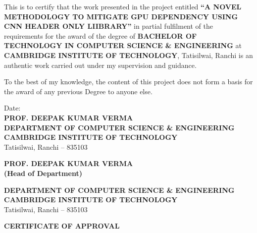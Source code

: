 \documentclass[12pt,oneside,a4paper]{report}
\newcommand{\prelimheading}[1]{%
  \begin{center}
    {\Large\bfseries\color{mnPrimary} #1}
  \end{center}
  \vspace{1cm}%
}
\begin{document}
This is to certify that the work presented in the project entitled \textbf{``A NOVEL METHODOLOGY TO MITIGATE GPU DEPENDENCY USING CNN HEADER ONLY LIIBRARY''} in partial fulfilment of the requirements for the award of the degree of \textbf{BACHELOR OF TECHNOLOGY IN COMPUTER SCIENCE \& ENGINEERING} at \textbf{CAMBRIDGE INSTITUTE OF TECHNOLOGY}, Tatisilwai, Ranchi is an authentic work carried out under my supervision and guidance.

\vspace{0.8cm}

To the best of my knowledge, the content of this project does not form a basis for the award of any previous Degree to anyone else.

\vspace{1.2cm}

Date: \underline{\hspace{3cm}} \hfill \\
\vspace{0.2cm}
\phantom{Date: } \hfill \textbf{PROF. DEEPAK KUMAR VERMA}\\
\vspace{0.1cm}
\phantom{Date: } \hfill \textbf{DEPARTMENT OF COMPUTER SCIENCE \& ENGINEERING}\\
\phantom{Date: } \hfill \textbf{CAMBRIDGE INSTITUTE OF TECHNOLOGY}\\
\phantom{Date: } \hfill Tatisilwai, Ranchi -- 835103

\vspace{1.0cm}



\vspace{0.5cm}

\begin{center}
\textbf{\large PROF. DEEPAK KUMAR VERMA}\\
\textbf{(Head of Department)}

\vspace{0.4cm}

\textbf{DEPARTMENT OF COMPUTER SCIENCE \& ENGINEERING}\\
\textbf{CAMBRIDGE INSTITUTE OF TECHNOLOGY}\\
Tatisilwai, Ranchi -- 835103
\end{center}

\newpage

\vspace*{0.5cm}
\prelimheading{\textbf{CERTIFICATE OF APPROVAL}}
\end{document}
